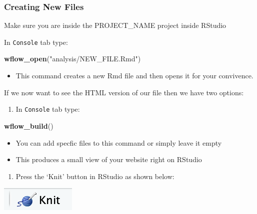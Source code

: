 \documentclass[]{book}
\newenvironment{Shaded}{\begin{snugshade}}{\end{snugshade}}
\newcommand{\KeywordTok}[1]{\textcolor[rgb]{0.13,0.29,0.53}{\textbf{#1}}}
\newcommand{\NormalTok}[1]{#1}
\newcommand{\StringTok}[1]{\textcolor[rgb]{0.31,0.60,0.02}{#1}}
\providecommand{\tightlist}{%
  \setlength{\itemsep}{0pt}\setlength{\parskip}{0pt}}
\begin{document}
\hypertarget{creating-new-files}{%
\subsubsection{Creating New Files}\label{creating-new-files}}

Make sure you are inside the PROJECT\_NAME project inside RStudio

In \texttt{Console} tab type:

\begin{Shaded}
\begin{Highlighting}[]
\KeywordTok{wflow_open}\NormalTok{(}\StringTok{"analysis/NEW_FILE.Rmd"}\NormalTok{)}
\end{Highlighting}
\end{Shaded}

\begin{itemize}
\tightlist
\item
  This command creates a new Rmd file and then opens it for your convivence.
\end{itemize}

If we now want to see the HTML version of our file then we have two options:

\begin{enumerate}
\def\labelenumi{\arabic{enumi}.}
\tightlist
\item
  In \texttt{Console} tab type:
\end{enumerate}

\begin{Shaded}
\begin{Highlighting}[]
\KeywordTok{wflow_build}\NormalTok{()}
\end{Highlighting}
\end{Shaded}

\begin{itemize}
\tightlist
\item
  You can add specfic files to this command or simply leave it empty
\item
  This produces a small view of your website right on RStudio
\end{itemize}

\begin{enumerate}
\def\labelenumi{\arabic{enumi}.}
\setcounter{enumi}{1}
\tightlist
\item
  Press the `Knit' button in RStudio as shown below:
\end{enumerate}

\begin{center}\includegraphics[width=0.1\linewidth]{images/Workflow_Photos/knit} \end{center}
\end{document}
